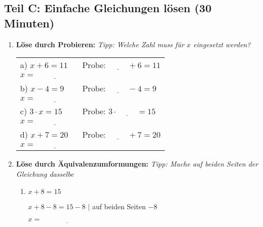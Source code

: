 \subsection*{Teil C: Einfache Gleichungen lösen (30 Minuten)}

\begin{enumerate}[label=\arabic*.]
    \item \textbf{Löse durch Probieren:}
    \textit{Tipp: Welche Zahl muss für $x$ eingesetzt werden?}
    \vspace{0.5cm}

    \begin{tabular}{ll}
        a) $x + 6 = 11$ & Probe: $\underline{\hspace{1cm}} + 6 = 11$ \\
        $x = \underline{\hspace{2cm}}$ & \\[3ex]
        b) $x - 4 = 9$ & Probe: $\underline{\hspace{1cm}} - 4 = 9$ \\
        $x = \underline{\hspace{2cm}}$ & \\[3ex]
        c) $3 \cdot x = 15$ & Probe: $3 \cdot \underline{\hspace{1cm}} = 15$ \\
        $x = \underline{\hspace{2cm}}$ & \\[3ex]
        d) $x + 7 = 20$ & Probe: $\underline{\hspace{1cm}} + 7 = 20$ \\
        $x = \underline{\hspace{2cm}}$ &
    \end{tabular}

    \vspace{1cm}

    \item \textbf{Löse durch Äquivalenzumformungen:}
    \textit{Tipp: Mache auf beiden Seiten der Gleichung dasselbe}
    \vspace{0.5cm}

    \begin{enumerate}[label=\alph*)]
        \item $x + 8 = 15$

        $x + 8 - 8 = 15 - 8$ \hspace{2cm} $|$ auf beiden Seiten $-8$

        $x = \underline{\hspace{3cm}}$


\end{enumerate}
\end{enumerate}
